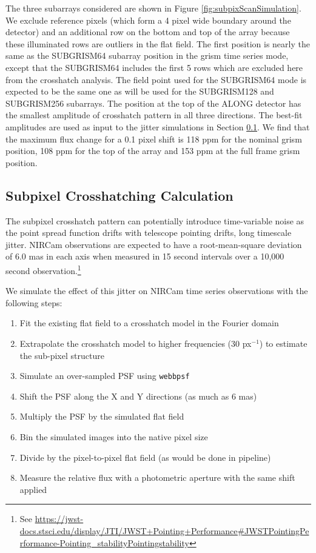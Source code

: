 \documentclass[]{aastex62}
\begin{document}
The three subarrays considered are shown in Figure \ref{fig:subpixScanSimulation}.
We exclude reference pixels (which form a 4 pixel wide boundary around the detector) and an additional row on the bottom and top of the array because these illuminated rows are outliers in the flat field.
The first position is nearly the same as the SUBGRISM64 subarray position in the grism time series mode, except that the SUBGRISM64 includes the first 5 rows which are excluded here from the crosshatch analysis.
The field point used for the SUBGRISM64 mode is expected to be the same one as will be used for the SUBGRISM128 and SUBGRISM256 subarrays.
The position at the top of the ALONG detector has the smallest amplitude of crosshatch pattern in all three directions.
The best-fit amplitudes are used as input to the jitter simulations in Section \ref{sec:CrosshatchSim}.
We find that the maximum flux change for a 0.1 pixel shift is 118 ppm for the nominal grism position, 108 ppm for the top of the array and 153 ppm at the full frame grism position.

\subsection{Subpixel Crosshatching Calculation}\label{sec:CrosshatchSim}

The subpixel crosshatch pattern can potentially introduce time-variable noise as the point spread function drifts with telescope pointing drifts, long timescale jitter.
NIRCam observations are expected to have a root-mean-square deviation of 6.0 mas in each axis when measured in 15 second intervals over a 10,000 second observation.\footnote{See \url{https://jwst-docs.stsci.edu/display/JTI/JWST+Pointing+Performance\#JWSTPointingPerformance-Pointing\_stabilityPointingstability}}

We simulate the effect of this jitter on NIRCam time series observations with the following steps:
\begin{enumerate}
	\item Fit the existing flat field to a crosshatch model in the Fourier domain
	\item Extrapolate the crosshatch model to higher frequencies (30 px$^{-1}$) to estimate the sub-pixel structure
	\item Simulate an over-sampled PSF using \texttt{webbpsf} \citep{perrin2014webbpsf}
	\item Shift the PSF along the X and Y directions (as much as 6 mas) \label{it:xHatchShiftPSF}
	\item Multiply the PSF by the simulated flat field
	\item Bin the simulated images into the native pixel size
	\item Divide by the pixel-to-pixel flat field (as would be done in pipeline)
	\item Measure the relative flux with a photometric aperture with the same shift applied \label{it:xHatchApPhot}
\end{enumerate}
\end{document}
